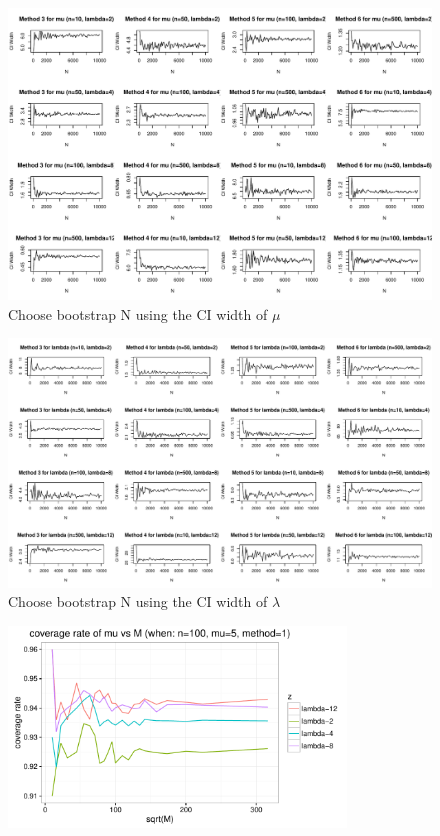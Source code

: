 \documentclass[12pt]{article}
\begin{document}
\begin{figure}[h] 
\includegraphics[width=1.0\textwidth]{findN_mu.pdf}
\caption{Choose bootstrap N using the CI width of $\mu$}
\end{figure}



\begin{figure}[h] 
\includegraphics[width=1.0\textwidth]{findN_la.pdf}
\caption{Choose bootstrap N using the CI width of $\lambda$}
\end{figure}


\begin{figure}[h] 
\includegraphics[width=0.8\textwidth]{findM1.pdf}
\caption{}
\end{figure}
\end{document}
